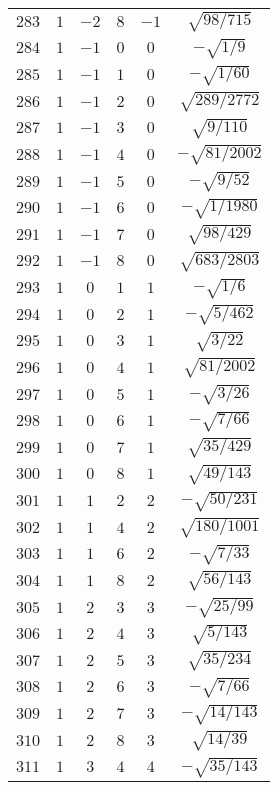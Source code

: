 \begin{table}
\begin{center}
\begin{tabular}{|c|c|c|c|c|c|}
$283$ & $1$ & $-2$ & $8$ & $-1$ & $\sqrt{98/715}$ \\ 
$284$ & $1$ & $-1$ & $0$ & $0$ & $-\sqrt{1/9}$ \\ 
$285$ & $1$ & $-1$ & $1$ & $0$ & $-\sqrt{1/60}$ \\ 
$286$ & $1$ & $-1$ & $2$ & $0$ & $\sqrt{289/2772}$ \\ 
$287$ & $1$ & $-1$ & $3$ & $0$ & $\sqrt{9/110}$ \\ 
$288$ & $1$ & $-1$ & $4$ & $0$ & $-\sqrt{81/2002}$ \\ 
$289$ & $1$ & $-1$ & $5$ & $0$ & $-\sqrt{9/52}$ \\ 
$290$ & $1$ & $-1$ & $6$ & $0$ & $-\sqrt{1/1980}$ \\ 
$291$ & $1$ & $-1$ & $7$ & $0$ & $\sqrt{98/429}$ \\ 
$292$ & $1$ & $-1$ & $8$ & $0$ & $\sqrt{683/2803}$ \\ 
$293$ & $1$ & $0$ & $1$ & $1$ & $-\sqrt{1/6}$ \\ 
$294$ & $1$ & $0$ & $2$ & $1$ & $-\sqrt{5/462}$ \\ 
$295$ & $1$ & $0$ & $3$ & $1$ & $\sqrt{3/22}$ \\ 
$296$ & $1$ & $0$ & $4$ & $1$ & $\sqrt{81/2002}$ \\ 
$297$ & $1$ & $0$ & $5$ & $1$ & $-\sqrt{3/26}$ \\ 
$298$ & $1$ & $0$ & $6$ & $1$ & $-\sqrt{7/66}$ \\ 
$299$ & $1$ & $0$ & $7$ & $1$ & $\sqrt{35/429}$ \\ 
$300$ & $1$ & $0$ & $8$ & $1$ & $\sqrt{49/143}$ \\ 
$301$ & $1$ & $1$ & $2$ & $2$ & $-\sqrt{50/231}$ \\ 
$302$ & $1$ & $1$ & $4$ & $2$ & $\sqrt{180/1001}$ \\ 
$303$ & $1$ & $1$ & $6$ & $2$ & $-\sqrt{7/33}$ \\ 
$304$ & $1$ & $1$ & $8$ & $2$ & $\sqrt{56/143}$ \\ 
$305$ & $1$ & $2$ & $3$ & $3$ & $-\sqrt{25/99}$ \\ 
$306$ & $1$ & $2$ & $4$ & $3$ & $\sqrt{5/143}$ \\ 
$307$ & $1$ & $2$ & $5$ & $3$ & $\sqrt{35/234}$ \\ 
$308$ & $1$ & $2$ & $6$ & $3$ & $-\sqrt{7/66}$ \\ 
$309$ & $1$ & $2$ & $7$ & $3$ & $-\sqrt{14/143}$ \\ 
$310$ & $1$ & $2$ & $8$ & $3$ & $\sqrt{14/39}$ \\ 
$311$ & $1$ & $3$ & $4$ & $4$ & $-\sqrt{35/143}$ \\ 

\end{tabular}
\end{center}
\end{table}
